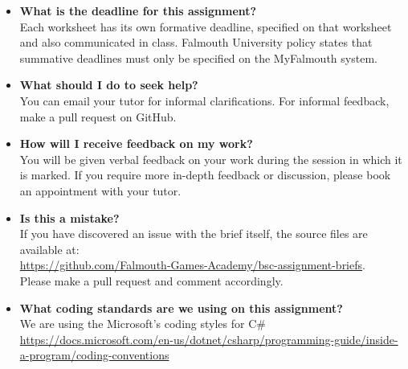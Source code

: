 \documentclass{../../fal_assignment}
\begin{document}
	\begin{itemize}
		\item 	\textbf{What is the deadline for this assignment?} \\ 
		Each worksheet has its own formative deadline, specified on that worksheet and also communicated in class.
		Falmouth University policy states that summative deadlines must only be specified on the MyFalmouth system.
		
		\item 	\textbf{What should I do to seek help?} \\ 
		You can email your tutor for informal clarifications. For informal feedback, make a pull request on GitHub. 
		
		\item 	\textbf{How will I receive feedback on my work?} \\ 
		You will be given verbal feedback on your work during the session in which it is marked.
		If you require more in-depth feedback or discussion, please book an appointment with your tutor.
		
		\item 	\textbf{Is this a mistake?} \\ 	
		If you have discovered an issue with the brief itself, the source files are available at: \\
		\url{https://github.com/Falmouth-Games-Academy/bsc-assignment-briefs}.\\
		Please make a pull request and comment accordingly.
		
		\item \textbf{What coding standards are we using on this assignment?}\\
		We are using the Microsoft's coding styles for C\# \\
		\url{https://docs.microsoft.com/en-us/dotnet/csharp/programming-guide/inside-a-program/coding-conventions}
	\end{itemize}
	
\end{document}
